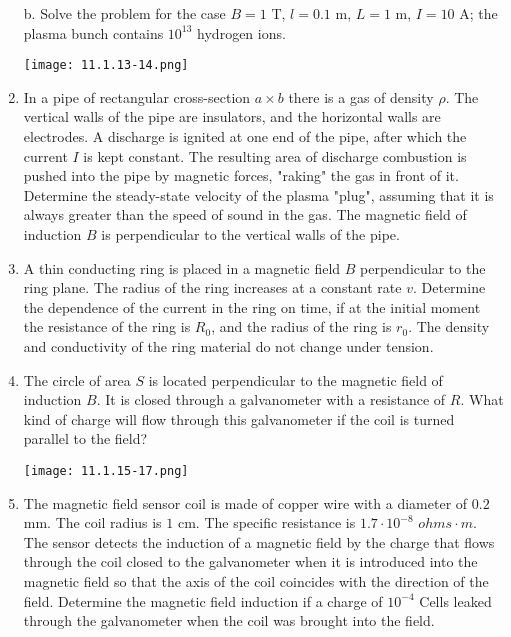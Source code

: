 \documentclass{article}
\begin{document}
\begin{enumerate}[label=11.1.\arabic*]
b. Solve the problem for the case $B = 1$ T, $l = 0.1$ m, $L = 1$ m, $I = 10$ A; the plasma bunch contains $10^{13}$ hydrogen ions.

\begin{center}
    \texttt{[image: 11.1.13-14.png]}
\end{center}

\item In a pipe of rectangular cross-section $a \times b$ there is a gas of density $\rho$. The vertical walls of the pipe are insulators, and the horizontal walls are electrodes. A discharge is ignited at one end of the pipe, after which the current $I$ is kept constant. The resulting area of discharge combustion is pushed into the pipe by magnetic forces, "raking" the gas in front of it. Determine the steady-state velocity of the plasma "plug", assuming that it is always greater than the speed of sound in the gas. The magnetic field of induction $B$ is perpendicular to the vertical walls of the pipe.

\item A thin conducting ring is placed in a magnetic field $B$ perpendicular to the ring plane. The radius of the ring increases at a constant rate $v$. Determine the dependence of the current in the ring on time, if at the initial moment the resistance of the ring is $R_0$, and the radius of the ring is $r_0$. The density and conductivity of the ring material do not change under tension.

\item The circle of area $S$ is located perpendicular to the magnetic field of induction $B$. It is closed through a galvanometer with a resistance of $R$. What kind of charge will flow through this galvanometer if the coil is turned parallel to the field?

\begin{center}
    \texttt{[image: 11.1.15-17.png]}
\end{center}

\item The magnetic field sensor coil is made of copper wire with a diameter of $0.2$ mm. The coil radius is $1$ cm. The specific resistance is $1.7 \cdot 10^{-8}$ $ohms \cdot m$. The sensor detects the induction of a magnetic field by the charge that flows through the coil closed to the galvanometer when it is introduced into the magnetic field so that the axis of the coil coincides with the direction of the field. Determine the magnetic field induction if a charge of $10^{-4}$ Cells leaked through the galvanometer when the coil was brought into the field.



\end{enumerate}
\end{document}
